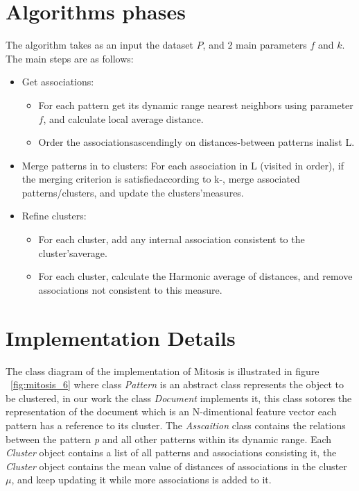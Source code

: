 \section{Algorithms phases}

The algorithm takes as an input the dataset $P$, and 2 main parameters $f$ and $k$. The main steps are as follows:
\begin{itemize}

\item {Get associations:
\begin{itemize}
	\item For each pattern get its dynamic range nearest neighbors using parameter $f$, and calculate local average distance.
	\item Order the associationsascendingly on distances-between patterns inalist L.
\end{itemize}
}


\item {Merge patterns in to clusters: For each association in L (visited in order), if the merging criterion is satisfiedaccording to k-, merge
associated patterns/clusters, and update the clusters'measures.}
\item {Refine clusters:
\begin{itemize}
\item For each cluster, add any internal association consistent to the cluster'saverage.
\item For each cluster, calculate the Harmonic average of distances, and remove associations not consistent to this measure.
\end{itemize}
}
\end{itemize}


\section{Implementation Details}
The class diagram of the implementation of Mitosis is illustrated in figure ~\ref{fig:mitosis_6} where class \textit{Pattern} is an abstract class represents the object to be clustered, in our work the class \textit{Document} implements it, this class sotores the representation of the document which is an N-dimentional feature vector each pattern has a reference to its cluster.
The \textit{Asscaition} class contains the relations between the pattern \textit{p} and all other patterns within its dynamic range. Each \textit{Cluster} object contains a list of all patterns and associations consisting it, the \textit{Cluster} object contains the mean value of distances of associations in the cluster $\mu$, and keep updating it while more associations is added to it.

